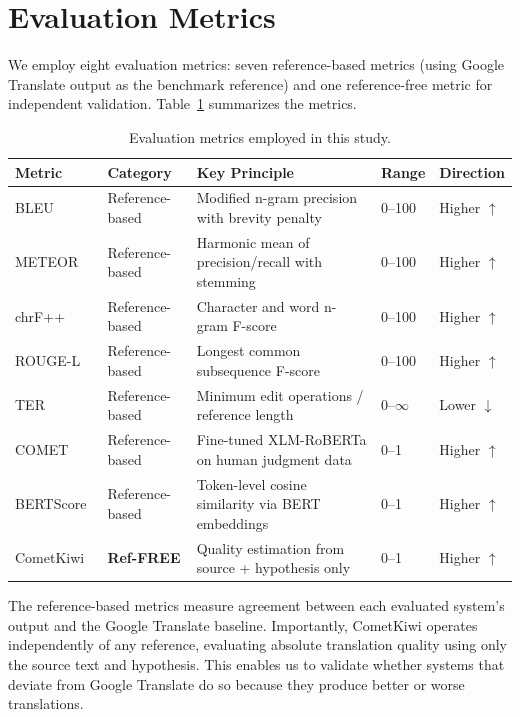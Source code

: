 \documentclass[pdflatex,sn-mathphys-num]{sn-jnl}
\begin{document}
\section{Evaluation Metrics}

We employ eight evaluation metrics: seven reference-based metrics (using Google Translate output as the benchmark reference) and one reference-free metric for independent validation. Table~\ref{tab:metrics} summarizes the metrics.

\begin{table}[h]
\centering
\caption{Evaluation metrics employed in this study.}\label{tab:metrics}
\begin{tabular}{@{}llp{5.5cm}ll@{}}
\toprule
Metric & Category & Key Principle & Range & Direction \\
\midrule
BLEU~\cite{20} & Reference-based & Modified n-gram precision with brevity penalty & 0--100 & Higher $\uparrow$ \\
METEOR~\cite{21} & Reference-based & Harmonic mean of precision/recall with stemming & 0--100 & Higher $\uparrow$ \\
chrF++~\cite{22} & Reference-based & Character and word n-gram F-score & 0--100 & Higher $\uparrow$ \\
ROUGE-L~\cite{23} & Reference-based & Longest common subsequence F-score & 0--100 & Higher $\uparrow$ \\
TER~\cite{24} & Reference-based & Minimum edit operations / reference length & 0--$\infty$ & Lower $\downarrow$ \\
COMET~\cite{25} & Reference-based & Fine-tuned XLM-RoBERTa on human judgment data & 0--1 & Higher $\uparrow$ \\
BERTScore~\cite{26} & Reference-based & Token-level cosine similarity via BERT embeddings & 0--1 & Higher $\uparrow$ \\
\rowcolor{white!15} CometKiwi~\cite{28} & \textbf{Ref-FREE} & Quality estimation from source + hypothesis only & 0--1 & Higher $\uparrow$ \\
\bottomrule
\end{tabular}
\end{table}

The reference-based metrics measure agreement between each evaluated system's output and the Google Translate baseline. Importantly, CometKiwi operates independently of any reference, evaluating absolute translation quality using only the source text and hypothesis. This enables us to validate whether systems that deviate from Google Translate do so because they produce better or worse translations.
\end{document}
